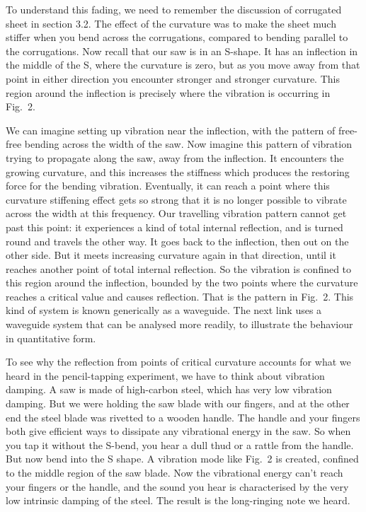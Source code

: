   To understand this fading, we need to remember the discussion of corrugated 
  sheet in section 3.2. The effect of the curvature was to make the sheet much 
  stiffer when you bend across the corrugations, compared to bending parallel 
  to the corrugations. Now recall that our saw is in an S-shape. It has an 
  inflection in the middle of the S, where the curvature is zero, but as you 
  move away from that point in either direction you encounter stronger and 
  stronger curvature. This region around the inflection is precisely where the 
  vibration is occurring in Fig.\ 2. 

  We can imagine setting up vibration near the inflection, with the pattern of 
  free-free bending across the width of the saw. Now imagine this pattern of 
  vibration trying to propagate along the saw, away from the inflection. It 
  encounters the growing curvature, and this increases the stiffness which 
  produces the restoring force for the bending vibration. Eventually, it can 
  reach a point where this curvature stiffening effect gets so strong that it 
  is no longer possible to vibrate across the width at this frequency. Our 
  travelling vibration pattern cannot get past this point: it experiences a 
  kind of total internal reflection, and is turned round and travels the other 
  way. It goes back to the inflection, then out on the other side. But it meets 
  increasing curvature again in that direction, until it reaches another point 
  of total internal reflection. So the vibration is confined to this region 
  around the inflection, bounded by the two points where the curvature reaches 
  a critical value and causes reflection. That is the pattern in Fig.\ 2. This 
  kind of system is known generically as a waveguide. The next link uses a 
  waveguide system that can be analysed more readily, to illustrate the 
  behaviour in quantitative form. 

  To see why the reflection from points of critical curvature accounts for what 
  we heard in the pencil-tapping experiment, we have to think about vibration 
  damping. A saw is made of high-carbon steel, which has very low vibration 
  damping. But we were holding the saw blade with our fingers, and at the other 
  end the steel blade was rivetted to a wooden handle. The handle and your 
  fingers both give efficient ways to dissipate any vibrational energy in the 
  saw. So when you tap it without the S-bend, you hear a dull thud or a rattle 
  from the handle. But now bend into the S shape. A vibration mode like Fig.\ 2 
  is created, confined to the middle region of the saw blade. Now the 
  vibrational energy can't reach your fingers or the handle, and the sound you 
  hear is characterised by the very low intrinsic damping of the steel. The 
  result is the long-ringing note we heard. 

